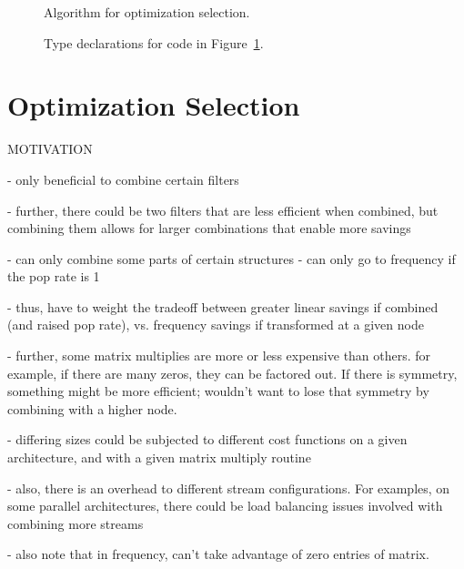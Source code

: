 \begin{figure}[t]
  \caption{Algorithm for optimization selection.
  \protect\label{fig:part-alg}}
\end{figure}

\begin{figure}[t]
  \caption{Type declarations for code in Figure~\ref{fig:part-alg}.}
\end{figure}


\section{Optimization Selection}

MOTIVATION

- only beneficial to combine certain filters

  - further, there could be two filters that are less efficient when
    combined, but combining them allows for larger combinations that
    enable more savings

- can only combine some parts of certain structures
- can only go to frequency if the pop rate is 1

  - thus, have to weight the tradeoff between greater linear savings
    if combined (and raised pop rate), vs. frequency savings if
    transformed at a given node

- further, some matrix multiplies are more or less expensive than
  others.  for example, if there are many zeros, they can be factored
  out.  If there is symmetry, something might be more efficient;
  wouldn't want to lose that symmetry by combining with a higher node.

  - differing sizes could be subjected to different cost functions on
  a given architecture, and with a given matrix multiply routine

- also, there is an overhead to different stream configurations.  For
  examples, on some parallel architectures, there could be load
  balancing issues involved with combining more streams

- also note that in frequency, can't take advantage of zero entries of
  matrix.

